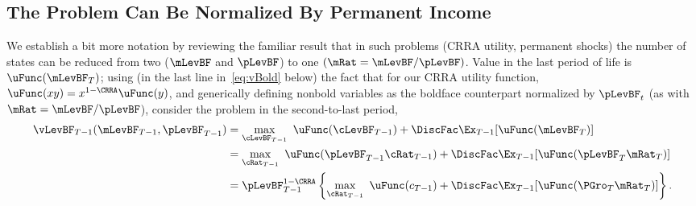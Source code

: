 \documentclass[BufferStockTheory]{subfiles}
\begin{document}
\hypertarget{The-Problem-Can-Be-Rewritten-in-Ratio-Form}{}
\hypertarget{The-Problem-Can-Be-Normalized-By-Permanent-Income}{}
\subsection{The Problem Can Be Normalized By Permanent Income}\label{subsec:ratio}

We establish a bit more notation by reviewing the familiar result that in such problems (CRRA utility, permanent shocks) the number of states can be reduced from two ($\mLevBF$ and $\pLevBF$) to one $(\mRat = \mLevBF/\pLevBF)$.  Value in the last period of life is $\uFunc(\mLevBF_{T})$; using (in the last line in~\eqref{eq:vBold} below) the fact that for our CRRA utility function, $\uFunc(xy) = x^{1-\CRRA}\uFunc(y)$, and generically defining nonbold variables as the boldface counterpart normalized by $\pLevBF_{t}$ (as with $\mRat=\mLevBF/\pLevBF$), consider the problem in the second-to-last period,
\begin{align}
  \vLevBF_{T-1}(\mLevBF_{T-1},\pLevBF_{T-1})  & =
                                                \max_{\cLevBF_{T-1}}~ \uFunc(\cLevBF_{T-1}) +\DiscFac \Ex_{T-1} [ \uFunc(\mLevBF_{T})]
                                                \notag \\
                                              & =  \max_{\cRat_{T-1}}~
                                                \uFunc(\pLevBF_{T-1}\cRat_{T-1}) + \DiscFac  \Ex_{T-1} [\uFunc(\pLevBF_{T}{\mRat}
                                                _{T})]  \notag \\
                                              & = \pLevBF_{T-1}^{1-\CRRA}
                                                \left\{\max_{\cRat_{T-1}}~ \uFunc(c_{T-1}) + \DiscFac \Ex_{T-1} [ \uFunc( {\PGro}_{T}
                                                {\mRat}_{T}) ] \right\}.   \label{eq:vBold}
\end{align}

\hypertarget{The-Related-Problem}{}
\end{document}

